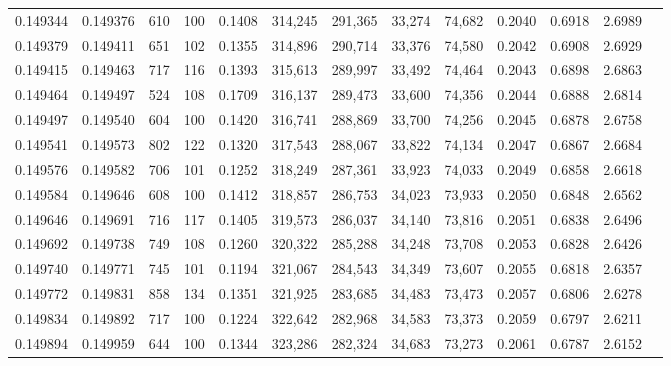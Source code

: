 \begin{tabular}{rrrrrrrrrrrrr}
0.149344 & 0.149376 &   610 & 100 &                                     0.1408 & 314,245 & 291,365 &  33,274 &  74,682 & 0.2040 & 0.6918 & 2.6989 \\
0.149379 & 0.149411 &   651 & 102 &                                     0.1355 & 314,896 & 290,714 &  33,376 &  74,580 & 0.2042 & 0.6908 & 2.6929 \\
0.149415 & 0.149463 &   717 & 116 &                                     0.1393 & 315,613 & 289,997 &  33,492 &  74,464 & 0.2043 & 0.6898 & 2.6863 \\
0.149464 & 0.149497 &   524 & 108 &                                     0.1709 & 316,137 & 289,473 &  33,600 &  74,356 & 0.2044 & 0.6888 & 2.6814 \\
0.149497 & 0.149540 &   604 & 100 &                                     0.1420 & 316,741 & 288,869 &  33,700 &  74,256 & 0.2045 & 0.6878 & 2.6758 \\
0.149541 & 0.149573 &   802 & 122 &                                     0.1320 & 317,543 & 288,067 &  33,822 &  74,134 & 0.2047 & 0.6867 & 2.6684 \\
0.149576 & 0.149582 &   706 & 101 &                                     0.1252 & 318,249 & 287,361 &  33,923 &  74,033 & 0.2049 & 0.6858 & 2.6618 \\
0.149584 & 0.149646 &   608 & 100 &                                     0.1412 & 318,857 & 286,753 &  34,023 &  73,933 & 0.2050 & 0.6848 & 2.6562 \\
0.149646 & 0.149691 &   716 & 117 &                                     0.1405 & 319,573 & 286,037 &  34,140 &  73,816 & 0.2051 & 0.6838 & 2.6496 \\
0.149692 & 0.149738 &   749 & 108 &                                     0.1260 & 320,322 & 285,288 &  34,248 &  73,708 & 0.2053 & 0.6828 & 2.6426 \\
0.149740 & 0.149771 &   745 & 101 &                                     0.1194 & 321,067 & 284,543 &  34,349 &  73,607 & 0.2055 & 0.6818 & 2.6357 \\
0.149772 & 0.149831 &   858 & 134 &                                     0.1351 & 321,925 & 283,685 &  34,483 &  73,473 & 0.2057 & 0.6806 & 2.6278 \\
0.149834 & 0.149892 &   717 & 100 &                                     0.1224 & 322,642 & 282,968 &  34,583 &  73,373 & 0.2059 & 0.6797 & 2.6211 \\
0.149894 & 0.149959 &   644 & 100 &                                     0.1344 & 323,286 & 282,324 &  34,683 &  73,273 & 0.2061 & 0.6787 & 2.6152 \\

\end{tabular}

